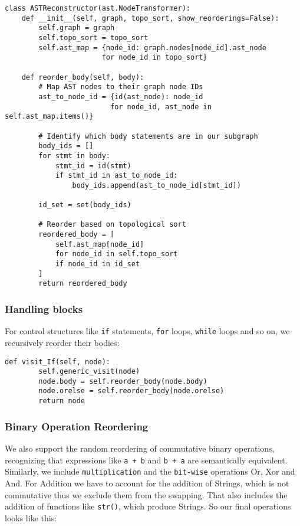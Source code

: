 \documentclass[%
thesis=student,%
coverpage=false,%
titlepage=false,%
headmarks=true, %
english,%
font=libertine, %
math=newpxtx, %
BCOR=5mm,%
coverBCOR=11mm%
]{tum-templates/book/tumbook}
\begin{document}
\begin{lstlisting}[style=pythonstyle, caption={The ASTReconstructor reordering statements by traversing the nodes of a program graph}]
class ASTReconstructor(ast.NodeTransformer):
    def __init__(self, graph, topo_sort, show_reorderings=False):
        self.graph = graph
        self.topo_sort = topo_sort
        self.ast_map = {node_id: graph.nodes[node_id].ast_node 
                       for node_id in topo_sort}
    
    def reorder_body(self, body):
        # Map AST nodes to their graph node IDs
        ast_to_node_id = {id(ast_node): node_id 
                         for node_id, ast_node in self.ast_map.items()}
        
        # Identify which body statements are in our subgraph
        body_ids = []
        for stmt in body:
            stmt_id = id(stmt)
            if stmt_id in ast_to_node_id:
                body_ids.append(ast_to_node_id[stmt_id])
        
        id_set = set(body_ids)
        
        # Reorder based on topological sort
        reordered_body = [
            self.ast_map[node_id]
            for node_id in self.topo_sort
            if node_id in id_set
        ]
        return reordered_body
\end{lstlisting}
\subsubsection{Handling blocks}
For control structures like \texttt{if} statements, \texttt{for} loops, \texttt{while} loops and so on, we recursively reorder their bodies:

\begin{lstlisting}[style=pythonstyle, caption={The recursive handling of blocks, here the if-blocks}]
def visit_If(self, node):
        self.generic_visit(node)
        node.body = self.reorder_body(node.body)
        node.orelse = self.reorder_body(node.orelse)
        return node
\end{lstlisting}
\subsubsection{Binary Operation Reordering}
We also support the random reordering of commutative binary operations, recognizing that expressions like \texttt{a + b} and \texttt{b + a} are semantically equivalent. Similarly, we include \texttt{multiplication} and the \texttt{bit-wise} operations Or, Xor and And. For Addition we have to account for the addition of Strings, which is not commutative thus we exclude them from the swapping. That also includes the addition of functions like \texttt{str()}, which produce Strings. So our final operations looks like this:
\end{document}
